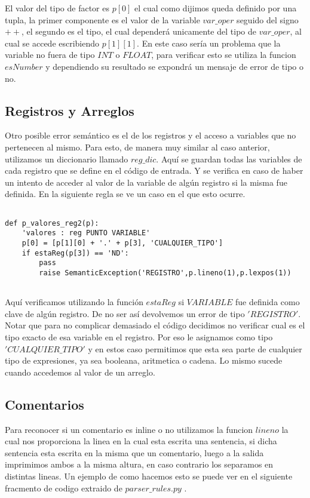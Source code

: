 El valor del tipo de factor es $p[0]$ el cual como dijimos queda definido por una tupla, la primer componente es el valor de la variable $var\_oper$ seguido del signo $++$, el segundo es el tipo, el cual dependerá unicamente del tipo de $var\_oper$, al cual se accede escribiendo $p[1][1]$. En este caso sería un problema que la variable no fuera de tipo $INT$ o $FLOAT$, para verificar esto se utiliza la funcion $esNumber$ y dependiendo su resultado se expondrá un mensaje de error de tipo o no.

\subsection{Registros y Arreglos}

Otro posible error semántico es el de los registros y el acceso a variables que no pertenecen al mismo. Para esto, de manera muy similar al caso anterior, utilizamos un diccionario llamado $reg\_dic$. Aquí se guardan todas las variables de cada registro que se define en el código de entrada. Y se verifica en caso de haber un intento de acceder al valor de la variable de algún registro si la misma fue definida. En la siguiente regla se ve un caso en el que esto ocurre.

\begin{verbatim}

def p_valores_reg2(p):
    'valores : reg PUNTO VARIABLE'
    p[0] = [p[1][0] + '.' + p[3], 'CUALQUIER_TIPO']
    if estaReg(p[3]) == 'ND':
        pass
        raise SemanticException('REGISTRO',p.lineno(1),p.lexpos(1))


\end{verbatim}

Aquí verificamos utilizando la función $estaReg$ si $VARIABLE$ fue definida como clave de algún registro. De no ser así devolvemos un error de tipo $'REGISTRO'$. Notar que para no complicar demasiado el código decidimos no verificar cual es el tipo exacto de esa variable en el registro. Por eso le asignamos como tipo $'CUALQUIER\_TIPO'$ y en estos caso permitimos que esta sea parte de cualquier tipo de expresiones, ya sea booleana, aritmetica o cadena. Lo mismo sucede cuando accedemos al valor de un arreglo.

\subsection{Comentarios}

Para reconocer si un comentario es inline o no utilizamos la funcion $lineno$ la cual nos proporciona la linea en la cual esta escrita una sentencia, si dicha sentencia esta escrita en la misma que un comentario, luego a la salida imprimimos ambos a la misma altura, en caso contrario los separamos en distintas lineas. Un ejemplo de como hacemos esto se puede ver en el siguiente fracmento de codigo extraido de $parser\_rules.py$ .

